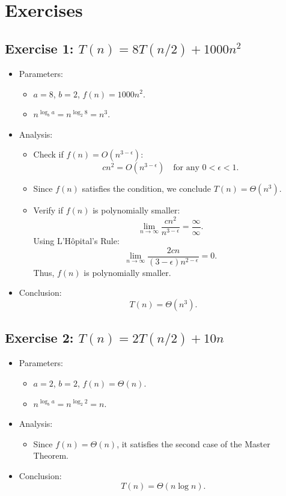 \section{Exercises}

\subsection{Exercise 1: \(T(n) = 8T(n/2) + 1000n^2\)}

\begin{itemize}
    \item Parameters:
    \begin{itemize}
        \item \(a = 8\), \(b = 2\), \(f(n) = 1000n^2\).
        \item \(n^{\log_b a} = n^{\log_2 8} = n^3\).
    \end{itemize}
    \item Analysis:
    \begin{itemize}
        \item Check if \(f(n) = O(n^{3-\epsilon})\):
        \[
        c n^2 = O(n^{3-\epsilon}) \quad \text{for any } 0 < \epsilon < 1.
        \]
        \item Since \(f(n)\) satisfies the condition, we conclude \(T(n) = \Theta(n^3)\).
        \item Verify if \(f(n)\) is polynomially smaller:
        \[
        \lim_{n \to \infty} \frac{c n^2}{n^{3-\epsilon}} = \frac{\infty}{\infty}.
        \]
        Using L'Hôpital's Rule:
        \[
        \lim_{n \to \infty} \frac{2c n}{(3-\epsilon)n^{2-\epsilon}} = 0.
        \]
        Thus, \(f(n)\) is polynomially smaller.
    \end{itemize}
    \item Conclusion:
    \[
    T(n) = \Theta(n^3).
    \]
\end{itemize}

\subsection{Exercise 2: \(T(n) = 2T(n/2) + 10n\)}

\begin{itemize}
    \item Parameters:
    \begin{itemize}
        \item \(a = 2\), \(b = 2\), \(f(n) = \Theta(n)\).
        \item \(n^{\log_b a} = n^{\log_2 2} = n\).
    \end{itemize}
    \item Analysis:
    \begin{itemize}
        \item Since \(f(n) = \Theta(n)\), it satisfies the second case of the Master Theorem.
    \end{itemize}
    \item Conclusion:
    \[
    T(n) = \Theta(n \log n).
    \]
\end{itemize}

